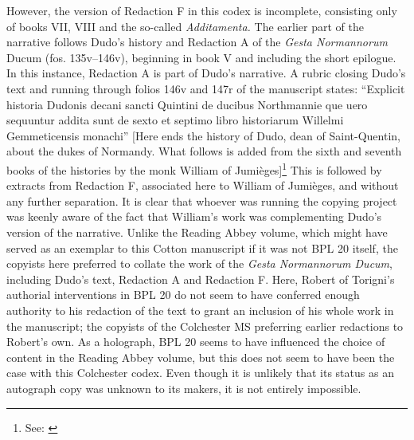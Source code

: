 \documentclass{article}
\begin{document}
However, the version of Redaction F in this codex is incomplete,
consisting only of books VII, VIII and the so-called \emph{Additamenta.}
The earlier part of the narrative follows Dudo's history and Redaction A
of the \emph{Gesta Normannorum} Ducum (fos. 135v--146v), beginning in
book V and including the short epilogue. In this instance, Redaction A
is part of Dudo's narrative. A rubric closing Dudo's text and running
through folios 146v and 147r of the manuscript states: ``Explicit
historia Dudonis decani sancti Quintini de ducibus Northmannie que uero
sequuntur addita sunt de sexto et septimo libro historiarum Willelmi
Gemmeticensis monachi'' [Here ends the history of Dudo, dean of Saint-Quentin, about the dukes of Normandy. What follows is added from the sixth and seventh books of the histories by the monk William of Jumièges]\footnote{See: \cite{noauthor_digitised_nodate}} This is followed by extracts from
Redaction F, associated here to William of Jumièges, and without any
further separation. It is clear that whoever was running the copying
project was keenly aware of the fact that William's work was
complementing Dudo's version of the narrative. Unlike the Reading Abbey
volume, which might have served as an exemplar to this Cotton manuscript
if it was not BPL 20 itself, the copyists here preferred to collate the
work of the \emph{Gesta Normannorum Ducum}, including Dudo's text,
Redaction A and Redaction F. Here, Robert of Torigni's authorial
interventions in BPL 20 do not seem to have conferred enough authority
to his redaction of the text to grant an inclusion of his whole work in
the manuscript; the copyists of the Colchester MS preferring earlier
redactions to Robert's own. As a holograph, BPL 20 seems to have
influenced the choice of content in the Reading Abbey volume, but this
does not seem to have been the case with this Colchester codex. 
Even though it is unlikely that its status as an autograph copy was unknown to its makers, 
it is not entirely impossible.
\end{document}
